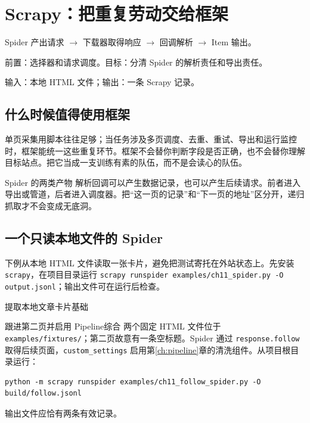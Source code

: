 \chapter{Scrapy：把重复劳动交给框架}\label{ch:scrapy}
\begin{tcolorbox}[title=章首知识地图,colframe=Ink]
Spider 产出请求 $\longrightarrow$ 下载器取得响应 $\longrightarrow$ 回调解析 $\longrightarrow$ Item 输出。
\end{tcolorbox}

\begin{tcolorbox}[title=学习目标与前置知识,colframe=Ink!65,colback=Ink!2]
前置：选择器和请求调度。目标：分清 Spider 的解析责任和导出责任。\par
输入：本地 HTML 文件；输出：一条 Scrapy 记录。
\end{tcolorbox}

\section{什么时候值得使用框架}
单页采集用脚本往往足够；当任务涉及多页调度、去重、重试、导出和运行监控时，框架能统一这些重复环节。框架不会替你判断字段是否正确，也不会替你理解目标站点。把它当成一支训练有素的队伍，而不是会读心的队伍。

\begin{definition}{Spider 的两类产物}
解析回调可以产生数据记录，也可以产生后续请求。前者进入导出或管道，后者进入调度器。把“这一页的记录”和“下一页的地址”区分开，递归抓取才不会变成无底洞。
\end{definition}

\section{一个只读本地文件的 Spider}
下例从本地 HTML 文件读取一张卡片，避免把测试寄托在外站状态上。先安装 \texttt{scrapy}，在项目目录运行 \texttt{scrapy runspider examples/ch11\_spider.py -O output.jsonl}；输出文件可在运行后检查。

\begin{example}{提取本地文章卡片}{基础}
\end{example}

\begin{example}{跟进第二页并启用 Pipeline}{综合}
两个固定 HTML 文件位于 \texttt{examples/fixtures/}；第二页故意有一条空标题。Spider 通过 \texttt{response.follow} 取得后续页面，\texttt{custom\_settings} 启用第\ref{ch:pipeline}章的清洗组件。从项目根目录运行：
\begin{Verbatim}[numbers=none]
python -m scrapy runspider examples/ch11_follow_spider.py -O build/follow.jsonl
\end{Verbatim}
输出文件应恰有两条有效记录。
\end{example}

